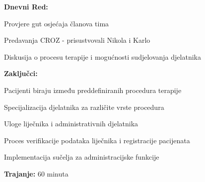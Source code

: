 \begin{packed_enum}
\begin{packed_item}
\begin{packed_item}
                        \item \textbf{Dnevni Red:}
                            \begin{packed_item}
                                \item Provjere gut osjećaja članova tima
                                \item Predavanja CROZ - prisustvovali Nikola i Karlo
                                \item Diskusija o procesu terapije i mogućnosti sudjelovanja djelatnika
                            \end{packed_item}
                        \item \textbf{Zaključci:}
                            \begin{packed_item}
                                \item Pacijenti biraju između preddefiniranih procedura terapije
                                \item Specijalizacija djelatnika za različite vrste procedura
                                \item Uloge liječnika i administrativnih djelatnika
                                \item Proces verifikacije podataka liječnika i registracije pacijenata
                                \item Implementacija sučelja za administracijske funkcije
                            \end{packed_item}
                        \item \textbf{Trajanje:} 60 minuta
                    \end{packed_item}
            \end{packed_item}
            
\vspace{30pt}


\end{packed_enum}
